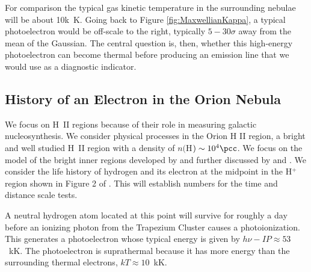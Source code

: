 \documentclass[debug, preprint, twocolumn]{rmaa}
\begin{document}
For comparison the typical gas kinetic temperature in the surrounding nebulae 
will be about 10k~K. 
Going back to Figure \ref{fig:MaxwellianKappa}, 
a typical photoelectron would be off-scale to the right, 
typically $5 -  30 \sigma$ away from the mean of the Gaussian. 
The central question is, then, whether this high-energy photoelectron can become 
thermal before producing an emission line that we would use as a diagnostic indicator.

\subsection{History of an Electron in the Orion Nebula}
\label{sec:Orion}


We focus on H~II regions because of their role in measuring galactic nucleosynthesis.
We  consider physical processes in the Orion H II region, 
a bright and well studied H~II region with a density of $n($H$) \sim 10^4 \pcc$.
We focus on the model of the bright inner regions developed by \citet{BFM} and
further discussed by \citet{Ferland2001a} and \citet{Ferland2003b}.
We consider the life history of hydrogen  and its   electron
at the midpoint in the H$^+$ region shown in Figure 2 of \citet{Ferland2003b}.
This will establish numbers for the time and distance scale tests.

A neutral hydrogen atom located at this point will survive for roughly a day before 
an ionizing photon from the Trapezium Cluster causes a photoionization. 
This  generates a photoelectron whose typical energy is given by 
$h\nu - IP \approx 53$~kK. 
The photoelectron is suprathermal  because it has more energy 
than the surrounding thermal electrons, $kT \approx 10$~kK. 
\end{document}
